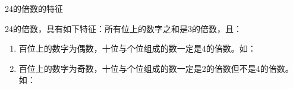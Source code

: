 \documentclass[aspectratio=169]{ctexbeamer} %
\date{\today}
\begin{document}
\begin{frame}[t]{24的倍数的特征}
\begin{spacing}{1.2}
\normalsize
24的倍数，具有如下特征：\alert{所有位上的数字之和是3的倍数，且：}
\begin{enumerate}[label={\arabic*.}]
\item \alert{百位上的数字为偶数，十位与个位组成的数一定是4的倍数。如：} 
\item \alert{百位上的数字为奇数，十位与个位组成的数一定是2的倍数但不是4的倍数。如：} 
\end{enumerate}

\end{spacing}
\end{frame}
\end{document}
